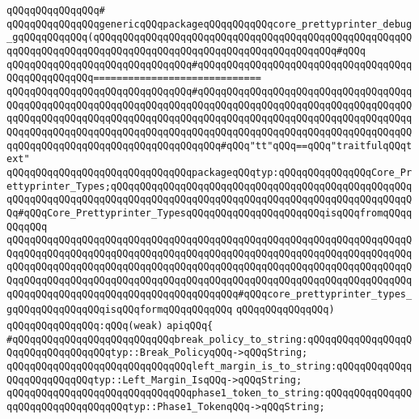 \verb|qQQqqQQqqQQqqQQq#|\newline
\verb|qQQqqQQqqQQqqQQqgenericqQQqpackageqQQqqQQqqQQqcore_prettyprinter_debug_gqQQqqQQqqQQq(qQQqqQQqqQQqqQQqqQQqqQQqqQQqqQQqqQQqqQQqqQQqqQQqqQQqqQQqqQQqqQQqqQQqqQQqqQQqqQQqqQQqqQQqqQQqqQQqqQQqqQQqqQQqqQQq#qQQq|\newline
\verb|qQQqqQQqqQQqqQQqqQQqqQQqqQQqqQQq#qQQqqQQqqQQqqQQqqQQqqQQqqQQqqQQqqQQqqQQqqQQqqQQqqQQq=============================|\newline
\verb|qQQqqQQqqQQqqQQqqQQqqQQqqQQqqQQq#qQQqqQQqqQQqqQQqqQQqqQQqqQQqqQQqqQQqqQQqqQQqqQQqqQQqqQQqqQQqqQQqqQQqqQQqqQQqqQQqqQQqqQQqqQQqqQQqqQQqqQQqqQQqqQQqqQQqqQQqqQQqqQQqqQQqqQQqqQQqqQQqqQQqqQQqqQQqqQQqqQQqqQQqqQQqqQQqqQQqqQQqqQQqqQQqqQQqqQQqqQQqqQQqqQQqqQQqqQQqqQQqqQQqqQQqqQQqqQQqqQQqqQQqqQQqqQQqqQQqqQQqqQQqqQQqqQQqqQQqqQQq#qQQq"tt"qQQq==qQQq"traitfulqQQqtext"|\newline
\verb|qQQqqQQqqQQqqQQqqQQqqQQqqQQqqQQqpackageqQQqtyp:qQQqqQQqqQQqqQQqCore_Prettyprinter_Types;qQQqqQQqqQQqqQQqqQQqqQQqqQQqqQQqqQQqqQQqqQQqqQQqqQQqqQQqqQQqqQQqqQQqqQQqqQQqqQQqqQQqqQQqqQQqqQQqqQQqqQQqqQQqqQQqqQQqqQQqqQQq#qQQqCore_Prettyprinter_TypesqQQqqQQqqQQqqQQqqQQqqQQqisqQQqfromqQQqqQQqqQQq|\newline
\verb|qQQqqQQqqQQqqQQqqQQqqQQqqQQqqQQqqQQqqQQqqQQqqQQqqQQqqQQqqQQqqQQqqQQqqQQqqQQqqQQqqQQqqQQqqQQqqQQqqQQqqQQqqQQqqQQqqQQqqQQqqQQqqQQqqQQqqQQqqQQqqQQqqQQqqQQqqQQqqQQqqQQqqQQqqQQqqQQqqQQqqQQqqQQqqQQqqQQqqQQqqQQqqQQqqQQqqQQqqQQqqQQqqQQqqQQqqQQqqQQqqQQqqQQqqQQqqQQqqQQqqQQqqQQqqQQqqQQqqQQqqQQqqQQqqQQqqQQqqQQqqQQqqQQqqQQqqQQqqQQq#qQQqcore_prettyprinter_types_gqQQqqQQqqQQqqQQqisqQQqformqQQqqQQqqQQq|\newline
\verb|qQQqqQQqqQQqqQQq)|\newline
\verb|qQQqqQQqqQQqqQQq:qQQq(weak)|\newline
\verb|apiqQQq{|\newline
\verb|#qQQqqQQqqQQqqQQqqQQqqQQqqQQqbreak_policy_to_string:qQQqqQQqqQQqqQQqqQQqqQQqqQQqqQQqqQQqtyp::Break_PolicyqQQq->qQQqString;|\newline
\verb|qQQqqQQqqQQqqQQqqQQqqQQqqQQqqQQqleft_margin_is_to_string:qQQqqQQqqQQqqQQqqQQqqQQqqQQqtyp::Left_Margin_IsqQQq->qQQqString;|\newline
\newline
\verb|qQQqqQQqqQQqqQQqqQQqqQQqqQQqqQQqphase1_token_to_string:qQQqqQQqqQQqqQQqqQQqqQQqqQQqqQQqqQQqtyp::Phase1_TokenqQQq->qQQqString;|\newline
